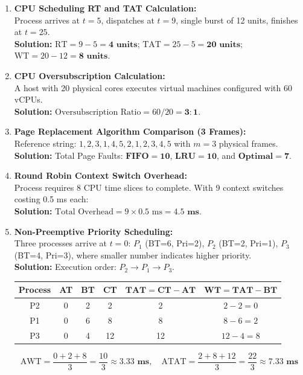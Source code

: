 \begin{enumerate}[label=\textbf{Problem \arabic*.},leftmargin=1.5cm]
\item \textbf{CPU Scheduling RT and TAT Calculation:} \\
Process arrives at $t = 5$, dispatches at $t = 9$, single burst of 12 units, finishes at $t = 25$. \\
\textbf{Solution:} $\text{RT} = 9 - 5 = \mathbf{4\text{ units}}$; $\text{TAT} = 25 - 5 = \mathbf{20\text{ units}}$; $\text{WT} = 20 - 12 = \mathbf{8\text{ units}}$.

\item \textbf{CPU Oversubscription Calculation:} \\
A host with 20 physical cores executes virtual machines configured with 60 vCPUs. \\
\textbf{Solution:} $\text{Oversubscription Ratio} = 60 / 20 = \mathbf{3:1}$.

\item \textbf{Page Replacement Algorithm Comparison (3 Frames):} \\
Reference string: $1, 2, 3, 1, 4, 5, 2, 1, 2, 3, 4, 5$ with $m = 3$ physical frames. \\
\textbf{Solution:} Total Page Faults: $\mathbf{\text{FIFO} = 10}$, $\mathbf{\text{LRU} = 10}$, and $\mathbf{\text{Optimal} = 7}$.

\item \textbf{Round Robin Context Switch Overhead:} \\
Process requires 8 CPU time slices to complete. With 9 context switches costing 0.5 ms each: \\
\textbf{Solution:} $\text{Total Overhead} = 9 \times 0.5\text{ ms} = \mathbf{4.5\text{ ms}}$.

\item \textbf{Non-Preemptive Priority Scheduling:} \\
Three processes arrive at $t = 0$: $P_1$ (BT=6, Pri=2), $P_2$ (BT=2, Pri=1), $P_3$ (BT=4, Pri=3), where smaller number indicates higher priority. \\
\textbf{Solution:} Execution order: $P_2 \to P_1 \to P_3$.
\begin{center}
\begin{tabular}{c c c c c c}
\toprule
\textbf{Process} & \textbf{AT} & \textbf{BT} & \textbf{CT} & $\mathbf{TAT = CT - AT}$ & $\mathbf{WT = TAT - BT}$ \\
\midrule
P2 & 0 & 2 & 2 & 2 & $2 - 2 = 0$ \\
P1 & 0 & 6 & 8 & 8 & $8 - 6 = 2$ \\
P3 & 0 & 4 & 12 & 12 & $12 - 4 = 8$ \\
\bottomrule
\end{tabular}
\end{center}
\[
\text{AWT} = \frac{0 + 2 + 8}{3} = \frac{10}{3} \approx \mathbf{3.33\text{ ms}}, \quad \text{ATAT} = \frac{2 + 8 + 12}{3} = \frac{22}{3} \approx \mathbf{7.33\text{ ms}}
\]


\end{enumerate}

